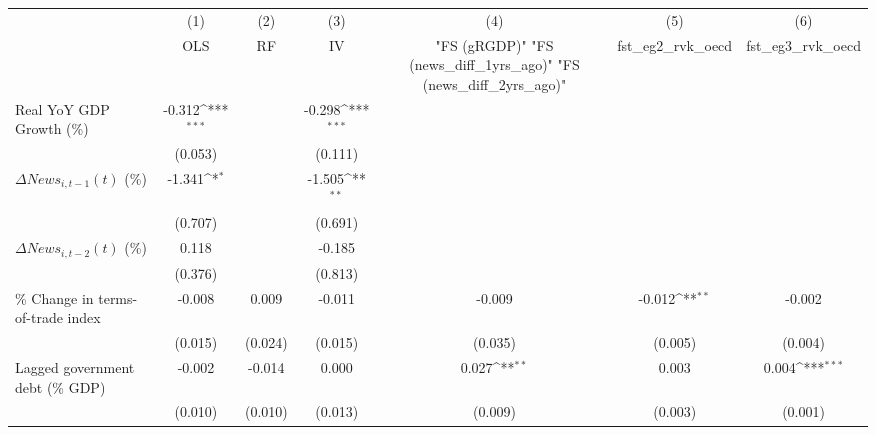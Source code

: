 {
\def\sym#1{\ifmmode^{#1}\else\(^{#1}\)\fi}
\begin{tabular}{l*{6}{c}}
\toprule
                    &\multicolumn{1}{c}{(1)}&\multicolumn{1}{c}{(2)}&\multicolumn{1}{c}{(3)}&\multicolumn{1}{c}{(4)}&\multicolumn{1}{c}{(5)}&\multicolumn{1}{c}{(6)}\\
                    &\multicolumn{1}{c}{OLS}&\multicolumn{1}{c}{RF}&\multicolumn{1}{c}{IV}&\multicolumn{1}{c}{ "FS (gRGDP)"  "FS (news_diff_1yrs_ago)"  "FS (news_diff_2yrs_ago)" }&\multicolumn{1}{c}{fst_eg2_rvk_oecd}&\multicolumn{1}{c}{fst_eg3_rvk_oecd}\\
\midrule
Real YoY GDP Growth (\%)&      -0.312\sym{***}&                     &      -0.298\sym{***}&                     &                     &                     \\
                    &     (0.053)         &                     &     (0.111)         &                     &                     &                     \\
\addlinespace
$ \Delta News_{i,t-1}(t)$ (\%)&      -1.341\sym{*}  &                     &      -1.505\sym{**} &                     &                     &                     \\
                    &     (0.707)         &                     &     (0.691)         &                     &                     &                     \\
\addlinespace
$ \Delta News_{i,t-2}(t)$ (\%)&       0.118         &                     &      -0.185         &                     &                     &                     \\
                    &     (0.376)         &                     &     (0.813)         &                     &                     &                     \\
\addlinespace
\% Change in terms-of-trade index&      -0.008         &       0.009         &      -0.011         &      -0.009         &      -0.012\sym{**} &      -0.002         \\
                    &     (0.015)         &     (0.024)         &     (0.015)         &     (0.035)         &     (0.005)         &     (0.004)         \\
\addlinespace
Lagged government debt (\% GDP)&      -0.002         &      -0.014         &       0.000         &       0.027\sym{**} &       0.003         &       0.004\sym{***}\\
                    &     (0.010)         &     (0.010)         &     (0.013)         &     (0.009)         &     (0.003)         &     (0.001)         \\

\end{tabular}}
